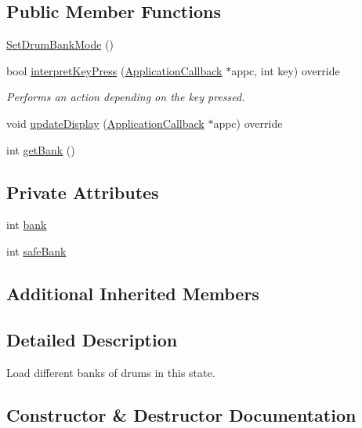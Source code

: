 \subsection*{Public Member Functions}
\begin{DoxyCompactItemize}
\item 
\hyperlink{classdrumpi_1_1SetDrumBankMode_af0e47a70b3175d10bd31827397c8f0a6}{Set\+Drum\+Bank\+Mode} ()
\item 
bool \hyperlink{classdrumpi_1_1SetDrumBankMode_a9b63a16aa08551a743c3751fa385c83b}{interpret\+Key\+Press} (\hyperlink{classdrumpi_1_1ApplicationCallback}{Application\+Callback} $\ast$appc, int key) override
\begin{DoxyCompactList}\small\item\em Performs an action depending on the key pressed. \end{DoxyCompactList}\item 
void \hyperlink{classdrumpi_1_1SetDrumBankMode_ae2f14f230923c5e0c19c780c59328822}{update\+Display} (\hyperlink{classdrumpi_1_1ApplicationCallback}{Application\+Callback} $\ast$appc) override
\item 
int \hyperlink{classdrumpi_1_1SetDrumBankMode_aa3e8ece8e6a54e9d631d82d6f315f06a}{get\+Bank} ()
\end{DoxyCompactItemize}
\subsection*{Private Attributes}
\begin{DoxyCompactItemize}
\item 
int \hyperlink{classdrumpi_1_1SetDrumBankMode_addef3a7e0513df0ddf7c8d335380d4c7}{bank}
\item 
int \hyperlink{classdrumpi_1_1SetDrumBankMode_a4cec73d2c5ec1cca126220316f800da1}{safe\+Bank}
\end{DoxyCompactItemize}
\subsection*{Additional Inherited Members}


\subsection{Detailed Description}
Load different banks of drums in this state. 

\subsection{Constructor \& Destructor Documentation}
\mbox{\label{classdrumpi_1_1SetDrumBankMode_af0e47a70b3175d10bd31827397c8f0a6}} 
